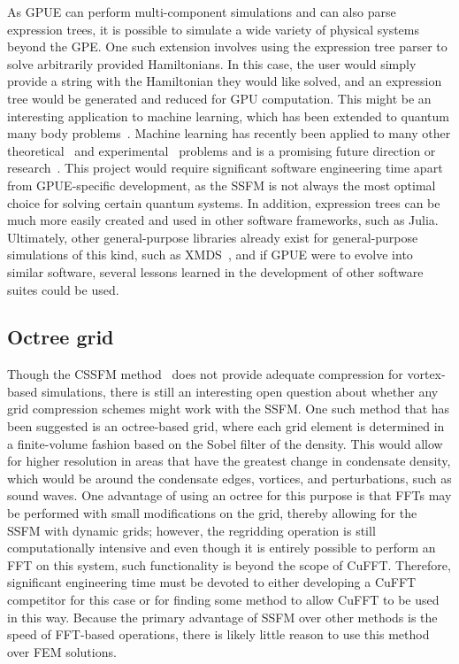 As GPUE can perform multi-component simulations and can also parse expression trees, it is possible to simulate a wide variety of physical systems beyond the GPE.
One such extension involves using the expression tree parser to solve arbitrarily provided Hamiltonians.
In this case, the user would simply provide a string with the Hamiltonian they would like solved, and an expression tree would be generated and reduced for GPU computation.
This might be an interesting application to machine learning, which has been extended to quantum many body problems~\cite{carleo2017}.
Machine learning has recently been applied to many other theoretical~\cite{carrasquilla2017} and experimental~\cite{wigley2016} problems and is a promising future direction or research~\cite{biamonte2017}.
This project would require significant software engineering time apart from GPUE-specific development, as the SSFM is not always the most optimal choice for solving certain quantum systems.
In addition, expression trees can be much more easily created and used in other software frameworks, such as Julia.
Ultimately, other general-purpose libraries already exist for general-purpose simulations of this kind, such as XMDS~\cite{dennis2013}, and if GPUE were to evolve into similar software, several lessons learned in the development of other software suites could be used.

\subsection{Octree grid}

Though the CSSFM method~\cite{bayindir2015} does not provide adequate compression for vortex-based simulations, there is still an interesting open question about whether any grid compression schemes might work with the SSFM.
One such method that has been suggested is an octree-based grid, where each grid element is determined in a finite-volume fashion based on the Sobel filter of the density.
This would allow for higher resolution in areas that have the greatest change in condensate density, which would be around the condensate edges, vortices, and perturbations, such as sound waves.
One advantage of using an octree for this purpose is that FFTs may be performed with small modifications on the grid, thereby allowing for the SSFM with dynamic grids; however, the regridding operation is still computationally intensive and even though it is entirely possible to perform an FFT on this system, such functionality is beyond the scope of CuFFT.
Therefore, significant engineering time must be devoted to either developing a CuFFT competitor for this case or for finding some method to allow CuFFT to be used in this way.
Because the primary advantage of SSFM over other methods is the speed of FFT-based operations, there is likely little reason to use this method over FEM solutions.

